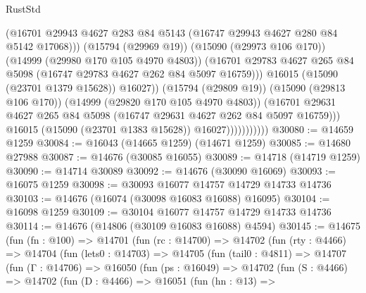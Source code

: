 \begin{lexlean}{RustStd}
\begin{coremodule}
                                    (@16701
                                      @29943
                                      @4627
                                      @283
                                      @84
                                      @5143
                                      (@16747 @29943 @4627 @280 @84 @5142 @17068)))
                                  (@15794 (@29969 @19))
                                  (@15090 (@29973 @106 @170))
                                  (@14999 (@29980 @170 @105 @4970 @4803))
                                  (@16701
                                    @29783
                                    @4627
                                    @265
                                    @84
                                    @5098
                                    (@16747 @29783 @4627 @262 @84 @5097 @16759)))
                                @16015
                                (@15090 (@23701 @1379 @15628))
                                @16027))
                            (@15794 (@29809 @19))
                            (@15090 (@29813 @106 @170))
                            (@14999 (@29820 @170 @105 @4970 @4803))
                            (@16701
                              @29631
                              @4627
                              @265
                              @84
                              @5098
                              (@16747 @29631 @4627 @262 @84 @5097 @16759)))
                          @16015
                          (@15090 (@23701 @1383 @15628))
                          @16027)))))))))))
@30080 := @14659 @1259
@30084 := @16043 (@14665 @1259) (@14671 @1259)
@30085 := @14680 @27988
@30087 := @14676 (@30085 @16055)
@30089 := @14718 (@14719 @1259)
@30090 := @14714 @30089
@30092 := @14676 (@30090 @16069)
@30093 := @16075 @1259
@30098 := @30093 @16077 @14757 @14729 @14733 @14736
@30103 := @14676 (@16074 (@30098 @16083 @16088) @16095)
@30104 := @16098 @1259
@30109 := @30104 @16077 @14757 @14729 @14733 @14736
@30114 := @14676 (@14806 (@30109 @16083 @16088) @4594)
@30145 := @14675
    (fun (fn : @100) =>
    @14701
      (fun (rc : @14700) =>
      @14702
        (fun (rty : @4466) =>
        @14704
          (fun (lets0 : @14703) =>
          @14705
            (fun (tail0 : @4811) =>
            @14707
              (fun (Γ : @14706) =>
              @16050
                (fun (ps : @16049) =>
                @14702
                  (fun (S : @4466) =>
                  @14702
                    (fun (D : @4466) =>
                    @16051
                      (fun (hn : @13) =>

\end{coremodule}
\end{lexlean}
